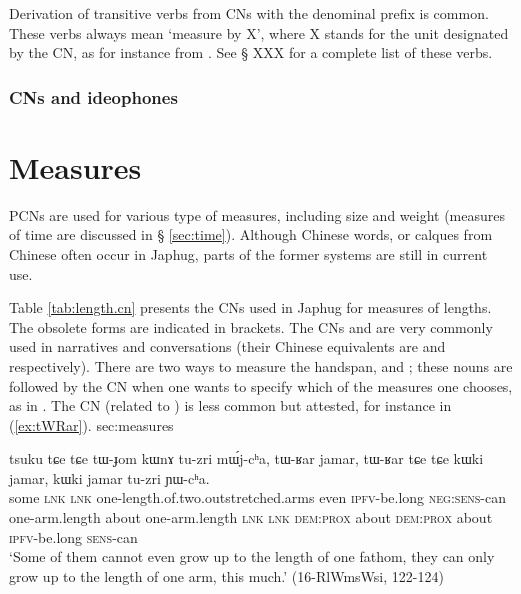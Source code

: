  
Derivation of transitive verbs from CNs with the denominal prefix  is common. These verbs always mean `measure by X', where X stands for the unit designated by the CN, as for instance  from . See § XXX for a complete list of these verbs.
 
\subsubsection{CNs and ideophones}   \label{sec:CN.ideophones}


\section{Measures} \label{sec:measures}
PCNs are used for various type of measures, including size and weight (measures of time are discussed in § \ref{sec:time}). Although Chinese words, or calques from Chinese often occur in Japhug, parts of the former systems are still in current use.

Table \ref{tab:length.cn} presents the CNs used in Japhug for measures of lengths. The obsolete forms are indicated in brackets. The CNs  and  are very commonly used in narratives and conversations (their Chinese equivalents are   and    respectively). There are two ways to measure the handspan,  and ; these nouns are followed by the CN when one wants to specify which of the measures one chooses, as in . The CN  (related to ) is less common but attested, for instance in (\ref{ex:tWRar}).
{sec:measures}
\begin{exe}
\ex \label{ex:tWRar} 
\gll  tsuku tɕe tɕe tɯ-ɟom kɯnɤ tu-zri mɯ́j-cʰa,  tɯ-ʁar jamar, tɯ-ʁar tɕe tɕe kɯki jamar, kɯki jamar tu-zri ɲɯ-cʰa. \\
some \textsc{lnk} \textsc{lnk} one-length.of.two.outstretched.arms even \textsc{ipfv}-be.long \textsc{neg}:\textsc{sens}-can one-arm.length about  one-arm.length \textsc{lnk} \textsc{lnk} \textsc{dem}:\textsc{prox}  about \textsc{dem}:\textsc{prox}  about \textsc{ipfv}-be.long \textsc{sens}-can \\
\glt `Some of them cannot even grow up to the length of one fathom, they can only grow up to the length of one arm, this much.' (16-RlWmsWsi, 122-124)
\end{exe}

